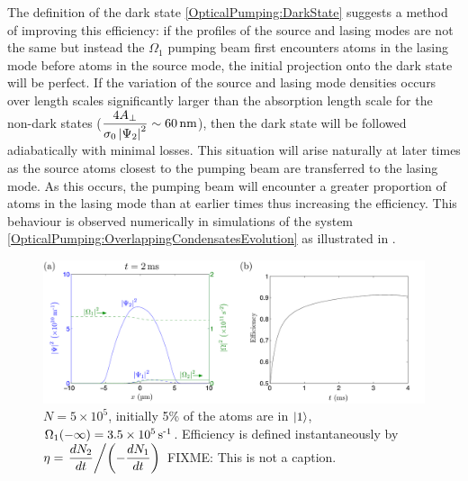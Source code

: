The definition of the dark state \eqref{OpticalPumping:DarkState} suggests a method of improving this efficiency: if the profiles of the source and lasing modes are not the same but instead the $\Omega_1$ pumping beam first encounters atoms in the lasing mode before atoms in the source mode, the initial projection onto the dark state will be perfect.  If the variation of the source and lasing mode densities occurs over length scales significantly larger than the absorption length scale for the non-dark states ($\displaystyle \frac{4 A_\perp}{\sigma_0 \abs{\Psi_2}^2} \sim \unit[60]{nm}$), then the dark state will be followed adiabatically with minimal losses.  This situation will arise naturally at later times as the source atoms closest to the pumping beam are transferred to the lasing mode.  As this occurs, the pumping beam will encounter a greater proportion of atoms in the lasing mode than at earlier times thus increasing the efficiency.  This behaviour is observed numerically in simulations of the system \eqref{OpticalPumping:OverlappingCondensatesEvolution} as illustrated in .

\begin{figure}
    \centering
    \includegraphics[width=15cm]{OverlappingCondensatesZeroDetuning}
    \caption{$N = 5 \times 10^5$, initially 5\% of the atoms are in ${\left|1\right>}$, $\Omega_1(-\infty) = 3.5 \times \unit[10^5]{s\textsuperscript{-1}}$. Efficiency is defined instantaneously by $\displaystyle\eta = \left.\frac{d N_2}{d t} \middle / \left(- \frac{d N_1}{dt}\right)\right.$ FIXME: This is not a caption.}
    \label{OpticalPumping:OverlappingCondensatesZeroDetuning}
\end{figure}


